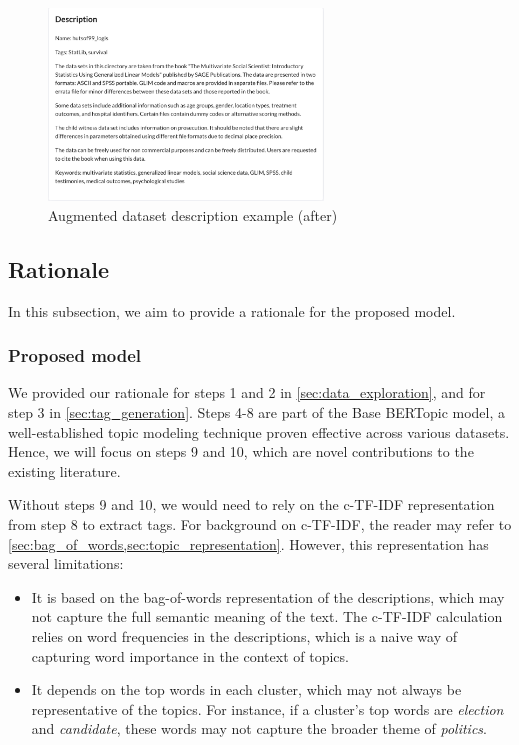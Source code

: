 \begin{figure}[h]
    \centering
    \includegraphics[width=0.65\textwidth]{figures/augmented_description_after.png}
    \caption{Augmented dataset description example (after)}
    \label{fig:augmented_description_after}
\end{figure}

\subsection{Rationale}
In this subsection, we aim to provide a rationale for the proposed model.

\subsubsection{Proposed model}
We provided our rationale for steps 1 and 2 in \cref{sec:data_exploration}, and for step 3 in \cref{sec:tag_generation}. Steps 4-8 are part of the Base BERTopic model, a well-established topic modeling technique proven effective across various datasets. Hence, we will focus on steps 9 and 10, which are novel contributions to the existing literature.

Without steps 9 and 10, we would need to rely on the c-TF-IDF representation from step 8 to extract tags. For background on c-TF-IDF, the reader may refer to \cref{sec:bag_of_words,sec:topic_representation}. However, this representation has several limitations:
\begin{itemize}
    \item It is based on the bag-of-words representation of the descriptions, which may not capture the full semantic meaning of the text. The c-TF-IDF calculation relies on word frequencies in the descriptions, which is a naive way of capturing word importance in the context of topics.
    \item It depends on the top words in each cluster, which may not always be representative of the topics. For instance, if a cluster's top words are \textit{election} and \textit{candidate}, these words may not capture the broader theme of \textit{politics}.
\end{itemize}

